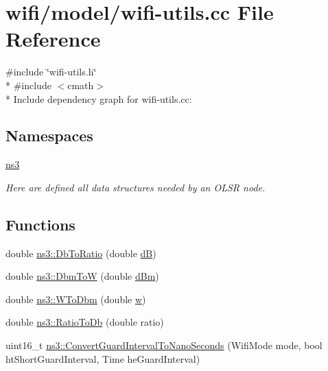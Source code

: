 \hypertarget{wifi-utils_8cc}{}\section{wifi/model/wifi-\/utils.cc File Reference}
\label{wifi-utils_8cc}
{\ttfamily \#include \char`\"{}wifi-\/utils.\+h\char`\"{}}\\*
{\ttfamily \#include $<$cmath$>$}\\*
Include dependency graph for wifi-\/utils.cc\+:
\subsection*{Namespaces}
\begin{DoxyCompactItemize}
\item 
 \hyperlink{namespacens3}{ns3}
\begin{DoxyCompactList}\small\item\em Here are defined all data structures needed by an O\+L\+SR node. \end{DoxyCompactList}\end{DoxyCompactItemize}
\subsection*{Functions}
\begin{DoxyCompactItemize}
\item 
double \hyperlink{namespacens3_a9bcb737f8802285d6bf0581ce1812afd}{ns3\+::\+Db\+To\+Ratio} (double \hyperlink{generate__test__data__lte__sinr_8m_ab8229e1234ec53128596ce427e8cadf2}{dB})
\item 
double \hyperlink{namespacens3_a0a3361f0554b892e3c6389256f5429b7}{ns3\+::\+Dbm\+ToW} (double \hyperlink{generate__test__data__lte__sinr_8m_a29e3c5e60f31e36ecdfd7ad769baea1c}{d\+Bm})
\item 
double \hyperlink{namespacens3_a256abf4ba6bab6e20f8419fff00e73e2}{ns3\+::\+W\+To\+Dbm} (double \hyperlink{mmwave_2model_2fading-traces_2fading__trace__generator_8m_afd61ec66f9d7b807eece6eb12c781844}{w})
\item 
double \hyperlink{namespacens3_a132cf27eedb5e15a1427faf8724be4d2}{ns3\+::\+Ratio\+To\+Db} (double ratio)
\item 
uint16\+\_\+t \hyperlink{namespacens3_a55676b01ef86544fd12cc854f9a32b2b}{ns3\+::\+Convert\+Guard\+Interval\+To\+Nano\+Seconds} (Wifi\+Mode mode, bool ht\+Short\+Guard\+Interval, Time he\+Guard\+Interval)
\end{DoxyCompactItemize}

